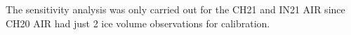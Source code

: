 \documentclass[utf8]{frontiersSCNS} %
\begin{document}
% 
% 
% 


The sensitivity analysis was only carried out for the CH21 and IN21 AIR since CH20 AIR had just 2 ice volume
observations for calibration.
\end{document}
